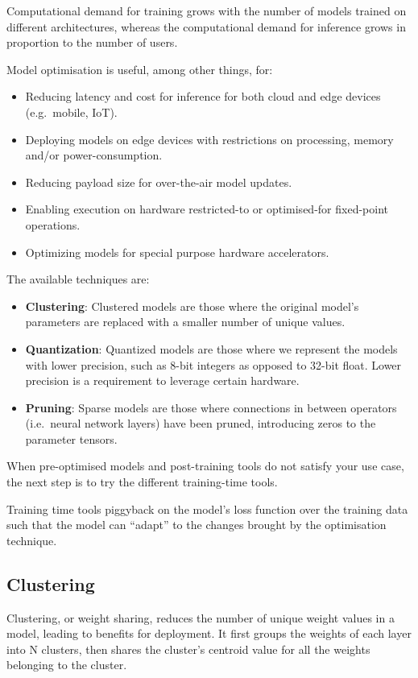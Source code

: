 Computational demand for training grows with the number of models trained on
different architectures, whereas the computational demand for inference grows
in proportion to the number of users.

Model optimisation is useful, among other things, for:

\begin{itemize}
    \item Reducing latency and cost for inference for both cloud and edge
        devices (e.g.\ mobile, IoT).
    \item Deploying models on edge devices with restrictions on processing,
        memory and/or power-consumption.
    \item Reducing payload size for over-the-air model updates.
    \item Enabling execution on hardware restricted-to or optimised-for
        fixed-point operations.
    \item Optimizing models for special purpose hardware accelerators.
\end{itemize}

The available techniques are:

\begin{itemize}
    \item \textbf{Clustering}: Clustered models are those where the original
        model's parameters are replaced with a smaller number of unique values.
    \item \textbf{Quantization}: Quantized models are those where we represent
        the models with lower precision, such as 8-bit integers as opposed to
        32-bit float. Lower precision is a requirement to leverage certain
        hardware.
    \item \textbf{Pruning}: Sparse models are those where connections in
        between operators (i.e.\ neural network layers) have been pruned,
        introducing zeros to the parameter tensors.
\end{itemize}

When pre-optimised models and post-training tools do not satisfy your use case,
the next step is to try the different training-time tools.

Training time tools piggyback on the model's loss function over the training
data such that the model can ``adapt'' to the changes brought by the
optimisation technique.~\cite{tfmot:intro}

\subsection{Clustering}
Clustering, or weight sharing, reduces the number of unique weight values in a
model, leading to benefits for deployment. It first groups the weights of each
layer into N clusters, then shares the cluster's centroid value for all the
weights belonging to the cluster.

